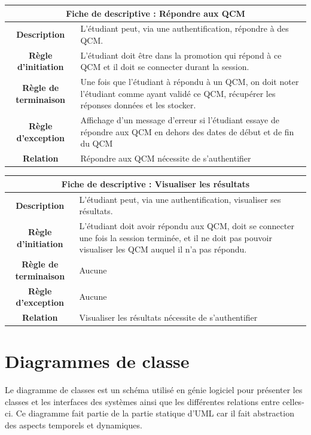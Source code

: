 \documentclass[10pt,a4paper,titlepage]{report}
\begin{document}
	\begin{tabular}{|c|p{8cm}|}
	\hline 
	\multicolumn{2}{|c|}{\textbf{Fiche de descriptive : Répondre aux QCM}} \\ 
	\hline 
	\textbf{Description} & L'étudiant peut, via une authentification, répondre à des QCM. \\  
	\hline
	\textbf{Règle d'initiation} & L'étudiant doit être dans la promotion qui répond à ce QCM et il doit se connecter durant la session. \\ 
	\hline 
	\textbf{Règle de terminaison} & Une fois que l’étudiant à répondu à un QCM, on doit noter l'étudiant comme ayant validé ce QCM, récupérer les réponses données et les stocker. \\ 
	\hline 
	\textbf{Règle d'exception} & Affichage d’un message d'erreur si l'étudiant essaye de répondre aux QCM en dehors des dates de début et de fin du QCM \\ 
	\hline 
	\textbf{Relation} & Répondre aux QCM nécessite de s'authentifier \\ 
	\hline 
	\end{tabular} 
	\newline \newline
	\newline
		\begin{tabular}{|c|p{8cm}|}
	\hline 
	\multicolumn{2}{|c|}{\textbf{Fiche de descriptive : Visualiser les résultats}} \\ 
	\hline 
	\textbf{Description} & L'étudiant peut, via une authentification, visualiser ses résultats. \\  
	\hline
	\textbf{Règle d'initiation} & L’étudiant doit avoir répondu aux QCM, doit se connecter une fois la session terminée, et il ne doit pas pouvoir visualiser les QCM auquel il n’a pas répondu. \\ 
	\hline 
	\textbf{Règle de terminaison} & Aucune \\ 
	\hline 
	\textbf{Règle d'exception} & Aucune \\ 
	\hline 
	\textbf{Relation} & Visualiser les résultats nécessite de s'authentifier \\ 
	\hline 
	\end{tabular} 
\section{Diagrammes de classe}
Le diagramme de classes est un schéma utilisé en génie logiciel pour présenter les classes et les interfaces des systèmes ainsi que les différentes relations entre celles-ci. Ce diagramme fait partie de la partie statique d'UML car il fait abstraction des aspects temporels et dynamiques.
\end{document}
